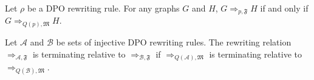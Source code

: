 \begin{lemma}
    Let $\rho$ be a DPO rewriting rule. For any graphs $G$ and $H$,
    $G \Rightarrow_{p,\mathfrak{F}} H$ if and only if $G \Rightarrow_{Q(p),\mathfrak{M}} H$.
\end{lemma}
\begin{corollary}
    \label{cor:termination}
    Let \(\mathcal{A}\) and \(\mathcal{B}\) be sets of injective DPO rewriting rules. 
    The rewriting relation $\Rightarrow_{\mathcal{A},\mathfrak{F}}$ is terminating relative to $\Rightarrow_{\mathcal{B},\mathfrak{F}}$ 
    if 
    $\Rightarrow_{Q(\mathcal{A}),\mathfrak{M}}$ is terminating relative to $\Rightarrow_{Q(\mathcal{B}),\mathfrak{M}}$.
\end{corollary}

